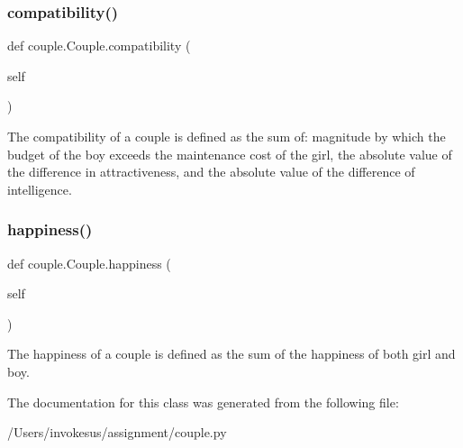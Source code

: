 \subsubsection{\texorpdfstring{compatibility()}{compatibility()}}
{\footnotesize\ttfamily def couple.\+Couple.\+compatibility (\begin{DoxyParamCaption}\item[{}]{self }\end{DoxyParamCaption})}

\begin{DoxyVerb}The compatibility of a couple is defined as the sum of: magnitude by which the budget of the boy exceeds the maintenance cost of the girl, the absolute value of the difference in attractiveness, and the absolute value of the difference of intelligence.\end{DoxyVerb}
 \mbox{\label{classcouple_1_1_couple_ab7ac98ab6a0dd03bf75790f949cb0c90}} 
\subsubsection{\texorpdfstring{happiness()}{happiness()}}
{\footnotesize\ttfamily def couple.\+Couple.\+happiness (\begin{DoxyParamCaption}\item[{}]{self }\end{DoxyParamCaption})}

\begin{DoxyVerb}The happiness of a couple is defined as the sum of the happiness of both girl and boy.
\end{DoxyVerb}
 

The documentation for this class was generated from the following file\+:\begin{DoxyCompactItemize}
\item 
/\+Users/invokesus/assignment/couple.\+py\end{DoxyCompactItemize}
